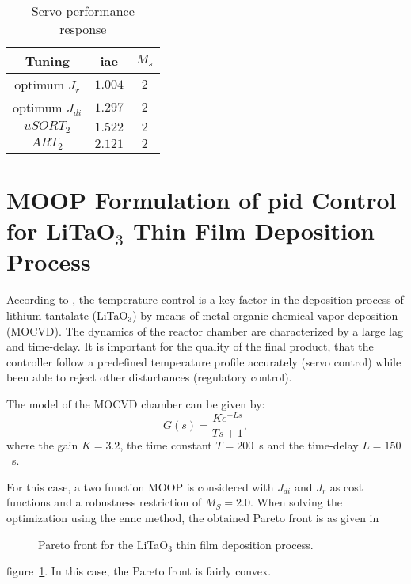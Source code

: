 %
\begin{table}
	\caption{Servo performance response}
	\centering
	\begin{tabular}{@{}*{3}{c}@{}}
		\toprule
		Tuning             &\gls{iae}        &$M_s$   \\
		\midrule              
		optimum $J_{r}$     &$1.004$   & $2$    \\
		optimum $J_{di}$    &$1.297$   & $2$    \\
		$uSORT_2$          &$1.522$   & $2$    \\
		$ART_2$          &$2.121$   & $2$    \\	
		
		\bottomrule				
	\end{tabular}
	\label{tab:IAEref}
\end{table}

\section{MOOP Formulation of \gls{pid} Control for LiTaO$_3$ Thin Film Deposition Process}
\label{sec:LiTaO3}
According to \parencite{Zhang2004}, the temperature control is a key factor in the deposition process of lithium tantalate (LiTaO$_3$) by means of metal organic chemical vapor deposition (MOCVD). The dynamics of the reactor chamber are characterized by a large lag and time-delay. It is important for the quality of the final product, that the controller follow a predefined temperature profile accurately (servo control) while been able to reject other disturbances (regulatory control).

The model of the MOCVD chamber can be given by:
\begin{equation}
G(s) = \frac{K e^{-L s}}{T s+1},
\label{eq:GsLita}
\end{equation}
%
where the gain $K = 3.2$, the time constant $T = 200$~s and the time-delay $L = 150$~s.

For this case, a two function MOOP is considered with $J_{di}$ and $J_{r}$ as cost functions and a robustness restriction of $M_S = 2.0$. When solving the optimization using the \gls{ennc} method, the obtained Pareto front is as given in %
\begin{figure}
	\centering
	\caption{Pareto front for the LiTaO$_3$ thin film deposition process.}
	\label{fig:LitaPareto}
\end{figure}
%
figure~\ref{fig:LitaPareto}. In this case, the Pareto front is fairly convex.

